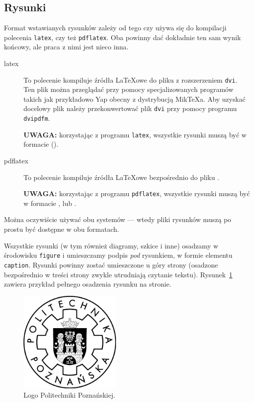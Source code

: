 \subsection{Rysunki}

Format wstawianych rysunków zależy od tego czy używa się do kompilacji polecenia
\texttt{latex}, czy też \texttt{pdflatex}. Oba powinny dać dokładnie ten sam wynik końcowy,
ale praca z nimi jest nieco inna.

\begin{description}
    \item[latex] To polecenie kompiluje źródła \LaTeX{}owe do pliku
    z rozszerzeniem \texttt{dvi}. Ten plik można przeglądać przy pomocy specjalizowanych programów
    takich jak przykładowo Yap obecny z dystrybucją Mik\TeX{}a. Aby uzyskać docelowy plik 
    należy przekonwertować plik \texttt{dvi} przy pomocy programu \texttt{dvipdfm}.

    \textbf{UWAGA:} korzystając z programu \texttt{latex}, wszystkie rysunki muszą być w formacie 
    ().

    \item[pdflatex] To polecenie kompiluje źródła \LaTeX{}owe bezpośrednio do pliku .

    \textbf{UWAGA:} korzystając z programu \texttt{pdflatex}, wszystkie rysunki muszą być w formacie ,
     lub .
\end{description}

Można oczywiście używać obu systemów --- wtedy pliki rysunków muszą po prostu być dostępne w obu formatach.

Wszystkie rysunki (w tym również diagramy, szkice i inne) osadzamy w środowisku
\texttt{figure} i umieszczamy podpis \emph{pod} rysunkiem, w formie elementu \texttt{caption}. Rysunki powinny
zostać umieszczone u góry strony (osadzone bezpośrednio w treści strony zwykle utrudniają czytanie tekstu).
Rysunek~\ref{rys:plama} zawiera przykład pełnego osadzenia rysunku na stronie.

\begin{figure}[t] %
    \centering\includegraphics[width=5cm]{figures/template/logo-pp}
    \caption{Logo Politechniki Poznańskiej.}\label{rys:plama}
\end{figure}

